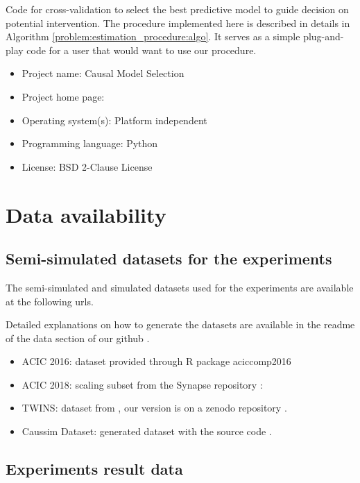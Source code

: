 \documentclass[a4paper,num-refs]{oup-contemporary}%
\begin{document}
Code for cross-validation to select the best predictive model to guide decision on potential intervention. The procedure implemented here is described in details in Algorithm \ref{problem:estimation_procedure:algo}. It serves as a simple plug-and-play code for a user that would want to use our procedure.

\begin{itemize}
    \item Project name: Causal Model Selection
    \item Project home page: \cite{doutreligne2025causal}
    \item Operating system(s): Platform independent
    \item Programming language: Python
    \item License: BSD 2-Clause License
\end{itemize}


\section{Data availability}

\subsection{Semi-simulated datasets for the experiments}

The semi-simulated and simulated datasets used for the experiments are available at the following urls.

Detailed explanations on how to generate the datasets are available in the readme of the data section of our github \cite{doutreligne2025caussim}.

\begin{itemize}
    \item ACIC 2016: dataset provided through R package aciccomp2016 \cite{dorie_automated_2019}

    \item ACIC 2018: scaling subset from the Synapse repository : \cite{shimoni2018ibm}

    \item TWINS: dataset from \cite{louizos_causal_2017}, our version is on a zenodo repository \cite{doutreligne2025twins}.

    \item Caussim Dataset: generated dataset with the source code \cite{doutreligne2025caussim}.
\end{itemize}
\subsection{Experiments result data}
\end{document}
